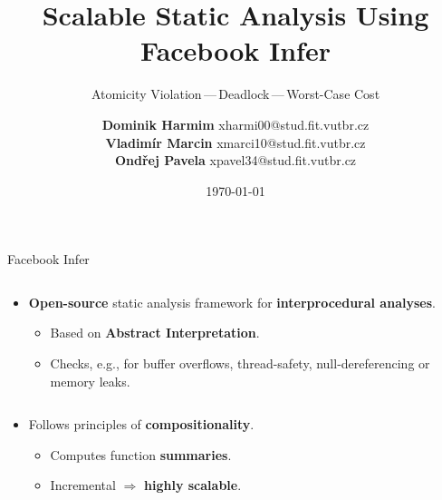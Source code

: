 \documentclass[10pt, usenames, dvipsnames, aspectratio=169]{beamer}
\title{Scalable Static Analysis Using Facebook Infer}
\subtitle{\texorpdfstring{
    Atomicity Violation\,---\,Deadlock\,---\,Worst-Case Cost
}{}}
\date{\today}
\author{\texorpdfstring{
    \textbf{Dominik Harmim} \hfill xharmi00@stud.fit.vutbr.cz \\
    \textbf{Vladimír Marcin} \hfill xmarci10@stud.fit.vutbr.cz \\
    \textbf{Ondřej Pavela} \hfill xpavel34@stud.fit.vutbr.cz \\[-2mm]
}{}}
\institute{
    \textbf{\normalsize{VeriFIT}}\small{\,--\,Adam Rogalewicz,
    Tomáš Fiedor, Tomáš Vojnar} \\[4mm]
}
\begin{document}
\maketitle


\begin{frame}{Facebook Infer}
    \large

    \begin{columns}[t]
        \begin{column}{1 \linewidth}
            \begin{itemize}
                \item
                    \alert{\textbf{Open-source}} static analysis framework
                    for \alert{\textbf{interprocedural analyses}}.

                    \begin{itemize}
                        \item
                            Based on \alert{\textbf{Abstract
                            Interpretation}}.
                            \vspace{0.4em}

                        \item
                            Checks, e.g., for buffer overflows,
                            thread-safety, null-dereferencing or
                            memory leaks.
                    \end{itemize}
            \end{itemize}
        \end{column}
        \hfill
    \end{columns}

    \vspace{0.8em}

    \begin{columns}[t]
        \begin{column}{0.6 \linewidth}
            \begin{itemize}
                \item
                    Follows principles of \alert{\textbf{compositionality}}.

                    \begin{itemize}
                        \item
                            Computes function \alert{\textbf{summaries}}.
                            \vspace{0.4em}

                        \item
                            Incremental $ \Longrightarrow $
                            \alert{\textbf{highly scalable}}.
                    \end{itemize}
                    \vspace{0.8em}


\end{itemize}
\end{column}
\end{columns}
\end{frame}
\end{document}
